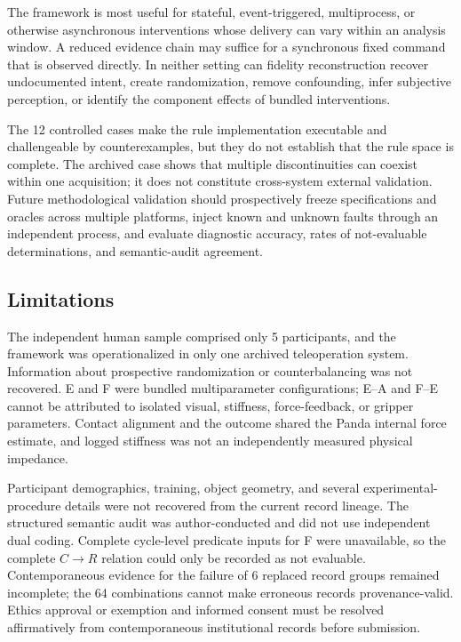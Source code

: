 \documentclass[journal]{IEEEtran}
\begin{document}
The framework is most useful for stateful, event-triggered, multiprocess, or
otherwise asynchronous interventions whose delivery can vary within an
analysis window. A reduced evidence chain may suffice for a synchronous fixed
command that is observed directly. In neither setting can fidelity
reconstruction recover undocumented intent, create randomization, remove
confounding, infer subjective perception, or identify the component effects
of bundled interventions.

The 12 controlled cases make the rule implementation executable and
challengeable by counterexamples, but they do not establish that the rule
space is complete. The archived case shows that multiple discontinuities can
coexist within one acquisition; it does not constitute cross-system external
validation. Future methodological validation should prospectively freeze
specifications and oracles across multiple platforms, inject known and unknown
faults through an independent process, and evaluate diagnostic accuracy, rates
of not-evaluable determinations, and semantic-audit agreement.

\subsection{Limitations}

The independent human sample comprised only 5 participants, and the framework
was operationalized in only one archived teleoperation system. Information
about prospective randomization or counterbalancing was not recovered. E and
F were bundled multiparameter configurations; E--A and F--E cannot be
attributed to isolated visual, stiffness, force-feedback, or gripper
parameters. Contact alignment and the outcome shared the Panda internal force
estimate, and logged stiffness was not an independently measured physical
impedance.

Participant demographics, training, object geometry, and several
experimental-procedure details were not recovered from the current record
lineage. The structured semantic audit was author-conducted and did not use
independent dual coding. Complete cycle-level predicate inputs for F were
unavailable, so the complete $C\rightarrow R$ relation could only be recorded
as not evaluable. Contemporaneous evidence for the failure of 6 replaced
record groups remained incomplete; the 64 combinations cannot make erroneous
records provenance-valid. Ethics approval or exemption and informed consent
must be resolved affirmatively from contemporaneous institutional records
before submission.
\end{document}
